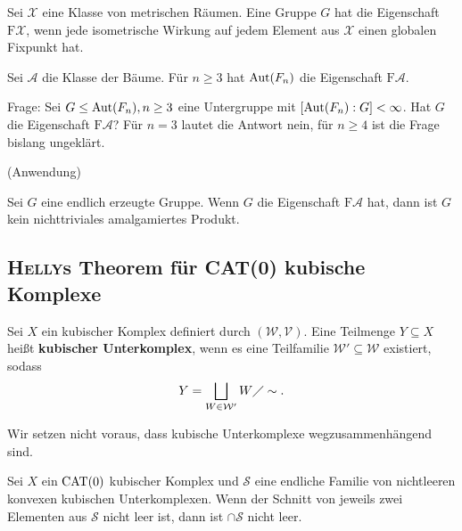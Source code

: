 \begin{definition}
\label{def:3.11}
	Sei  $\mathcal{X}$ eine Klasse von metrischen Räumen.
	Eine Gruppe $G$ hat die Eigenschaft $\text{F}\mathcal{X}$, wenn jede isometrische Wirkung auf jedem Element aus $\mathcal{X}$ einen globalen Fixpunkt hat.
\end{definition}

\begin{beispiel}
\label{bsp:3.12}
	Sei $\mathcal{A}$ die Klasse der Bäume.
	Für $n \geq 3$ hat $\operatorname{Aut}(F_n)$ die Eigenschaft $\text{F}\mathcal{A}$. 
\end{beispiel}

Frage:
Sei $G \leq \operatorname{Aut}(F_n), n \geq 3$ eine Untergruppe mit $[\operatorname{Aut}(F_n) : G] < \infty$. Hat $G$ die Eigenschaft $\text{F}\mathcal{A}$? Für $n = 3$ lautet die Antwort nein, für $n \geq 4$ ist die Frage bislang ungeklärt.

(Anwendung)

\begin{no-satz}
	Sei $G$ eine endlich erzeugte Gruppe.
	Wenn $G$ die Eigenschaft $\text{F}\mathcal{A}$ hat, dann ist $G$ kein nichttriviales amalgamiertes Produkt.
\end{no-satz}

\subsection{\textsc{Helly}s Theorem für CAT(0) kubische Komplexe}
\label{subsec:3.1.2}

\begin{definition}
\label{def:3.13}
	Sei $X$ ein kubischer Komplex definiert durch $(\mathcal{W},\mathcal{V})$.
	Eine Teilmenge $Y \subseteq X$ heißt \textbf{kubischer Unterkomplex}, wenn es eine Teilfamilie $\mathcal{W'} \subseteq \mathcal{W}$ existiert, sodass
	\[
		Y = \bigsqcup_{W \in \mathcal{W}'} W \diagup \sim.
	\]
\end{definition}

\begin{bemerkung}
\label{bem:3.14}
	Wir setzen nicht voraus, dass kubische Unterkomplexe wegzusammenhängend sind.
\end{bemerkung}

\begin{theorem}
\label{thm:3.15}
	Sei $X$ ein $\operatorname{CAT(0)}$ kubischer Komplex und $\mathcal{S}$ eine endliche Familie von nichtleeren konvexen kubischen Unterkomplexen.
	Wenn der Schnitt von jeweils zwei Elementen aus $\mathcal{S}$ nicht leer ist, dann ist $\cap \mathcal{S}$ nicht leer.
\end{theorem}